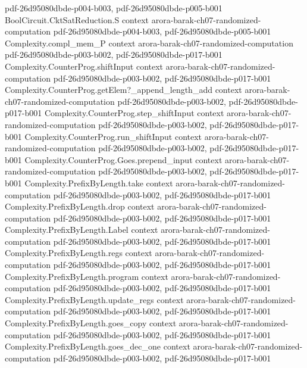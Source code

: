 \begin{theorem}
  {pdf-26d95080dbde-p004-b003,
    pdf-26d95080dbde-p005-b001}
\proofstep
  {BoolCircuit.CktSatReduction.S}
  {context}
  {arora-barak-ch07-randomized-computation}
  {pdf-26d95080dbde-p004-b003,
    pdf-26d95080dbde-p005-b001}
\proofstep
  {Complexity.compl_mem_P}
  {context}
  {arora-barak-ch07-randomized-computation}
  {pdf-26d95080dbde-p003-b002,
    pdf-26d95080dbde-p017-b001}
\proofstep
  {Complexity.CounterProg.shiftInput}
  {context}
  {arora-barak-ch07-randomized-computation}
  {pdf-26d95080dbde-p003-b002,
    pdf-26d95080dbde-p017-b001}
\proofstep
  {Complexity.CounterProg.getElem?_append_length_add}
  {context}
  {arora-barak-ch07-randomized-computation}
  {pdf-26d95080dbde-p003-b002,
    pdf-26d95080dbde-p017-b001}
\proofstep
  {Complexity.CounterProg.step_shiftInput}
  {context}
  {arora-barak-ch07-randomized-computation}
  {pdf-26d95080dbde-p003-b002,
    pdf-26d95080dbde-p017-b001}
\proofstep
  {Complexity.CounterProg.run_shiftInput}
  {context}
  {arora-barak-ch07-randomized-computation}
  {pdf-26d95080dbde-p003-b002,
    pdf-26d95080dbde-p017-b001}
\proofstep
  {Complexity.CounterProg.Goes.prepend_input}
  {context}
  {arora-barak-ch07-randomized-computation}
  {pdf-26d95080dbde-p003-b002,
    pdf-26d95080dbde-p017-b001}
\proofstep
  {Complexity.PrefixByLength.take}
  {context}
  {arora-barak-ch07-randomized-computation}
  {pdf-26d95080dbde-p003-b002,
    pdf-26d95080dbde-p017-b001}
\proofstep
  {Complexity.PrefixByLength.drop}
  {context}
  {arora-barak-ch07-randomized-computation}
  {pdf-26d95080dbde-p003-b002,
    pdf-26d95080dbde-p017-b001}
\proofstep
  {Complexity.PrefixByLength.Label}
  {context}
  {arora-barak-ch07-randomized-computation}
  {pdf-26d95080dbde-p003-b002,
    pdf-26d95080dbde-p017-b001}
\proofstep
  {Complexity.PrefixByLength.regs}
  {context}
  {arora-barak-ch07-randomized-computation}
  {pdf-26d95080dbde-p003-b002,
    pdf-26d95080dbde-p017-b001}
\proofstep
  {Complexity.PrefixByLength.program}
  {context}
  {arora-barak-ch07-randomized-computation}
  {pdf-26d95080dbde-p003-b002,
    pdf-26d95080dbde-p017-b001}
\proofstep
  {Complexity.PrefixByLength.update_regs}
  {context}
  {arora-barak-ch07-randomized-computation}
  {pdf-26d95080dbde-p003-b002,
    pdf-26d95080dbde-p017-b001}
\proofstep
  {Complexity.PrefixByLength.goes_copy}
  {context}
  {arora-barak-ch07-randomized-computation}
  {pdf-26d95080dbde-p003-b002,
    pdf-26d95080dbde-p017-b001}
\proofstep
  {Complexity.PrefixByLength.goes_dec_one}
  {context}
  {arora-barak-ch07-randomized-computation}
  {pdf-26d95080dbde-p003-b002,
    pdf-26d95080dbde-p017-b001}

\end{theorem}
